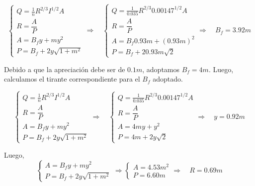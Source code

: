 \begin{equation*}
  \begin{cases}
    Q = \frac{1}{n} R^{2/3} I^{1/2} A \\
    R = \dfrac{A}{P} \\
    A = B_{f}y + m y^{2} \\
    P = B_{f} + 2 y \sqrt{1 + m^{2}}
  \end{cases}
  \Longrightarrow \quad
  \begin{cases}
    Q = \frac{1}{0.035} R^{2/3} 0.00147^{1/2} A \\
    R = \dfrac{A}{P} \\
    A = B_{f}0.93 m + (0.93 m)^2 \\
    P = B_{f} + 2 0.93 m \sqrt{2}
  \end{cases}
  \Longrightarrow \quad
  B_{f} = 3.92 m
\end{equation*}

Debido a que la apreciación debe ser de $0.1 m$, adoptamos $B_{f} = 4 m$.
Luego, calculamos el tirante correspondiente para el $B_{f}$ adoptado.

\begin{equation*}
  \begin{cases}
    Q = \frac{1}{n} R^{2/3} I^{1/2} A \\
    R = \dfrac{A}{P} \\
    A = B_{f}y + m y^{2} \\
    P = B_{f} + 2 y \sqrt{1 + m^{2}}
  \end{cases}
  \Longrightarrow \quad
  \begin{cases}
    Q = \frac{1}{0.035} R^{2/3} 0.00147^{1/2} A \\
    R = \dfrac{A}{P} \\
    A = 4 m y + y^2 \\
    P = 4 m + 2 y \sqrt{2}
  \end{cases}
  \Longrightarrow \quad
  y = 0.92 m
\end{equation*}

Luego,
\begin{equation*}
  \begin{cases}
    A = B_{f}y + m y^{2} \\
    P = B_{f} + 2 y \sqrt{1 + m^{2}}
  \end{cases}
  \Longrightarrow
  \begin{cases}
    A = 4.53 m^2 \\
    P = 6.60 m
  \end{cases}
  \Longrightarrow \quad
  R = 0.69 m
\end{equation*}


